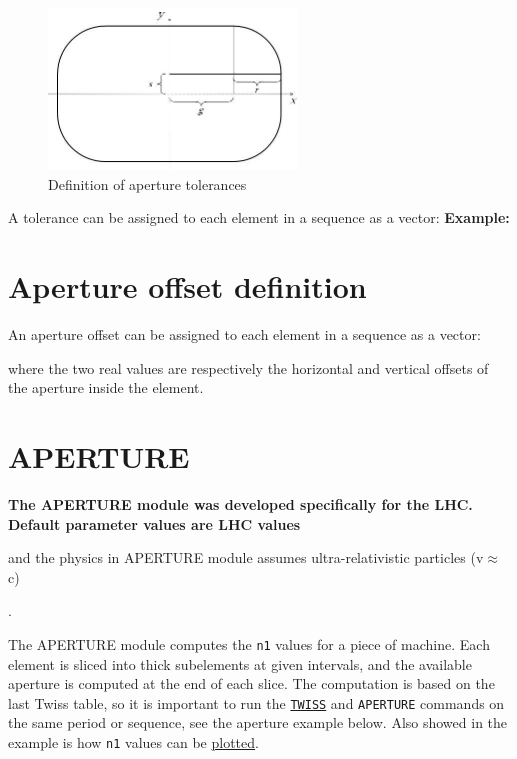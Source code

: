 \begin{figure}[htb]
  \begin{center}
    \includegraphics[width=250px]{jpg/tolerance.jpg}
    \caption{Definition of aperture tolerances}
    \label{fig:aperture_tol}
  \end{center}
\end{figure}

A tolerance can be assigned to each element in a \madx sequence as a vector: 
{\bf Example:}

\section{Aperture offset definition}
\label{sec:aperoffset}

An aperture offset can be assigned to each element in a \madx sequence as a vector: 

where the two real values are respectively the horizontal and vertical
offsets of the aperture inside the element.


\section{APERTURE}
\label{sec:aperture}
{\bf The APERTURE module was developed specifically for the LHC.\\ 
Default parameter values are LHC values\begin{5.02.04} and the physics 
in APERTURE module assumes ultra-relativistic particles (v\(\approx\)c)\end{5.02.04}.} 

The APERTURE module computes the {\tt n1} values for a piece of machine. 
Each element is sliced into thick subelements at given intervals, and
the available aperture is computed at the end of each slice. 
The computation is based on the last Twiss table, so it is important to
run the \hyperref[chap:twiss]{\tt TWISS} and \texttt{APERTURE} commands
on the same period or sequence, see the aperture example below. Also showed in the
example is how {\tt n1} values can be \hyperref[chap:plot]{plotted}.


